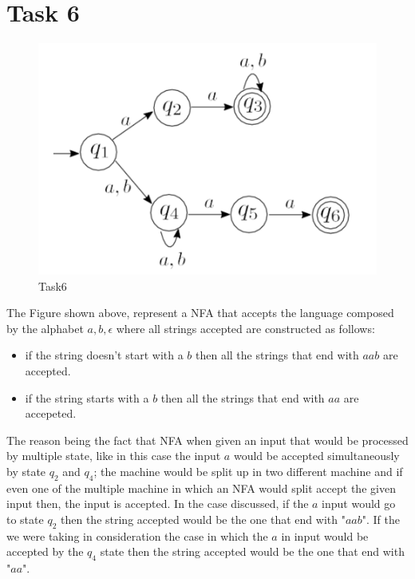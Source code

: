 \chapter{Task 6}
\begin{figure}[hbt]	
\label{Task6}
  \centering\includegraphics[width=\textwidth]{Immagini/fsm_task6.png}
  \caption{Task6}
\end{figure}
The Figure shown above, represent a NFA that accepts the language composed by the alphabet ${a,b, \epsilon}$ where all strings accepted are constructed as follows:
\begin{itemize}
	\item if the string doesn't start with a $b$ then all the strings that end with $aab$ are accepted.
	\item if the string starts with a $b$ then all the strings that end with $aa$ are accepeted.
\end{itemize}
The reason being the fact that NFA when given an input that would be processed by multiple state, like in this case the input $a$ would be accepted simultaneously by state $q_2$ and $q_4$; the machine would be split up in two different machine and if even one of the multiple machine in which an NFA would split accept the given input then, the input is accepted. In the case discussed, if the $a$ input would go to state $q_2$ then the string accepted would be the one that end with "$aab$". If the we were taking in consideration the case in which the $a$ in input would be accepted by the $q_4$ state then the string accepted would be the one that end with "$aa$".\cite{Sipser:2006aa}
